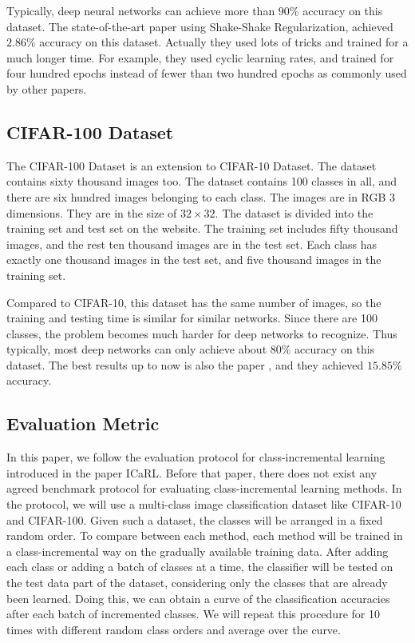 Typically, deep neural networks can achieve more than $90\%$ accuracy on this dataset. The state-of-the-art paper using Shake-Shake Regularization\cite{gastaldi2017shake}, achieved $2.86\%$ accuracy on this dataset. Actually they used lots of tricks and trained for a much longer time. For example, they used cyclic learning rates, and trained for four hundred epochs instead of fewer than two hundred epochs as commonly used by other papers.

\subsection{CIFAR-100 Dataset}
The CIFAR-100 Dataset is an extension to CIFAR-10 Dataset. The dataset contains sixty thousand images too. The dataset contains 100 classes in all, and there are six hundred images belonging to each class. The images are in RGB 3 dimensions. They are in the size of $32 \times 32$. The dataset is divided into the training set and test set on the website. The training set includes fifty thousand images, and the rest ten thousand images are in the test set. Each class has exactly one thousand images in the test set, and five thousand images in the training set.

Compared to CIFAR-10, this dataset has the same number of images, so the training and testing time is similar for similar networks. Since there are 100 classes, the problem becomes much harder for deep networks to recognize. Thus typically, most deep networks can only achieve about $80\%$ accuracy on this dataset. The best results up to now is also the paper \cite{gastaldi2017shake}, and they achieved $15.85\%$ accuracy.

\subsection{Evaluation Metric}

In this paper, we follow the evaluation protocol for class-incremental learning introduced in the paper ICaRL\cite{rebuffi2017icarl}. Before that paper, there does not exist any agreed benchmark protocol for evaluating class-incremental learning methods. In the protocol, we will use a multi-class image classification dataset like CIFAR-10 and CIFAR-100. Given such a dataset, the classes will be arranged in a fixed random order. To compare between each method, each method will be trained in a class-incremental way on the gradually available training data. After adding each class or adding a batch of classes at a time, the classifier will be tested on the test data part of the dataset, considering only the classes that are already been learned. Doing this, we can obtain a curve of the classification accuracies after each batch of incremented classes. We will repeat this procedure for 10 times with different random class orders and average over the curve.

